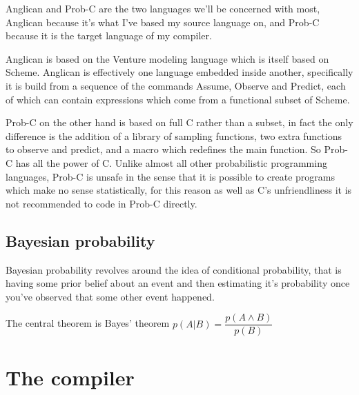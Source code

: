 \documentclass[a4paper]{article}
\begin{document}
Anglican and Prob-C are the two languages we'll be concerned with most, Anglican because it's what I've based my source language on, and Prob-C because it is the target language of my compiler.

Anglican is based on the Venture modeling language which is itself based on Scheme. Anglican is effectively one language embedded inside another, specifically it is build from a sequence of the commands Assume, Observe and Predict, each of which can contain expressions which come from a functional subset of Scheme.

Prob-C on the other hand is based on full C rather than a subset, in fact the only difference is the addition of a library of sampling functions, two extra functions to observe and predict, and a macro which redefines the main function. So Prob-C has all the power of C. Unlike almost all other probabilistic programming languages, Prob-C is unsafe in the sense that it is possible to create programs which make no sense statistically, for this reason as well as C's unfriendliness it is not recommended to code in Prob-C directly.



\subsection{Bayesian probability}

Bayesian probability revolves around the idea of conditional probability, that is having some prior belief about an event and then estimating it's probability once you've observed that some other event happened.

The central theorem is Bayes' theorem \(p(A | B) = \dfrac{p(A \land B)}{p(B)}\)




\section{The compiler}
\end{document}
